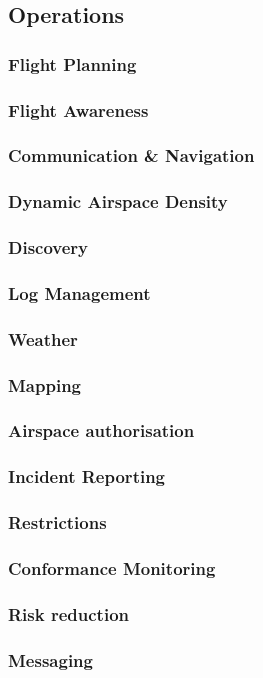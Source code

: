 \documentclass[usenames,dvipsnames,aspectratio=169,serif]{beamer}
\begin{document}
\subsection{Operations}
\begin{frame}
	\frametitle{Flight Planning}
\end{frame}

\begin{frame}
	\frametitle{Flight Awareness}
\end{frame}

\begin{frame}
	\frametitle{Communication \& Navigation}
\end{frame}

\begin{frame}
	\frametitle{Dynamic Airspace Density}
\end{frame}

\begin{frame}
	\frametitle{Discovery}
\end{frame}

\begin{frame}
	\frametitle{Log Management}
\end{frame}

\begin{frame}
	\frametitle{Weather}
\end{frame}

\begin{frame}
	\frametitle{Mapping}
\end{frame}

\begin{frame}
	\frametitle{Airspace authorisation}
\end{frame}

\begin{frame}
	\frametitle{Incident Reporting}
\end{frame}


\begin{frame}
	\frametitle{Restrictions}
\end{frame}

\begin{frame}
	\frametitle{Conformance Monitoring}
\end{frame}

\begin{frame}
	\frametitle{Risk reduction}
\end{frame}

\begin{frame}
	\frametitle{Messaging}
\end{frame}
\end{document}
